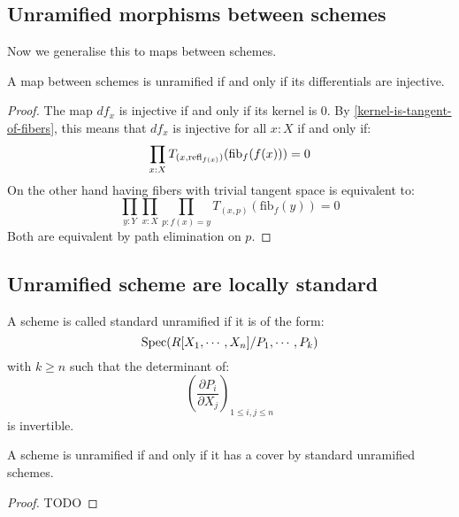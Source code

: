 \subsection{Unramified morphisms between schemes}

Now we generalise this to maps between schemes.

\begin{proposition}\label{unramified-map-characterisation}
A map between schemes is unramified if and only if its differentials are injective. 
\end{proposition}

\begin{proof}
The map $df_x$ is injective if and only if its kernel is $0$. By \cref{kernel-is-tangent-of-fibers}, this means that $df_x$ is injective for all $x:X$ if and only if:
\[
\prod_{x:X}T_{(x,\mathrm{refl}_{f(x)})}(\mathrm{fib}_f(f(x)))=0
\]
On the other hand having fibers with trivial tangent space is equivalent to:
\[
\prod_{y:Y}\prod_{x:X}\prod_{p:f(x)=y} T_{(x,p)}(\mathrm{fib}_f(y)) = 0
\]
Both are equivalent by path elimination on $p$.
\end{proof}


\subsection{Unramified scheme are locally standard}

\begin{definition}
A scheme is called standard unramified if it is of the form:
\[\operatorname{Spec}(R[X_1,\cdots,X_n]/P_1,\cdots,P_k)\]
with $k\geq n$ such that the determinant of:
\[\left( \frac{\partial P_i}{\partial X_j}\right)_{1\leq i,j\leq n}\]
is invertible.
\end{definition}

\begin{proposition}
A scheme is unramified if and only if it has a cover by standard unramified schemes.
\end{proposition}

\begin{proof}
TODO
\end{proof}


